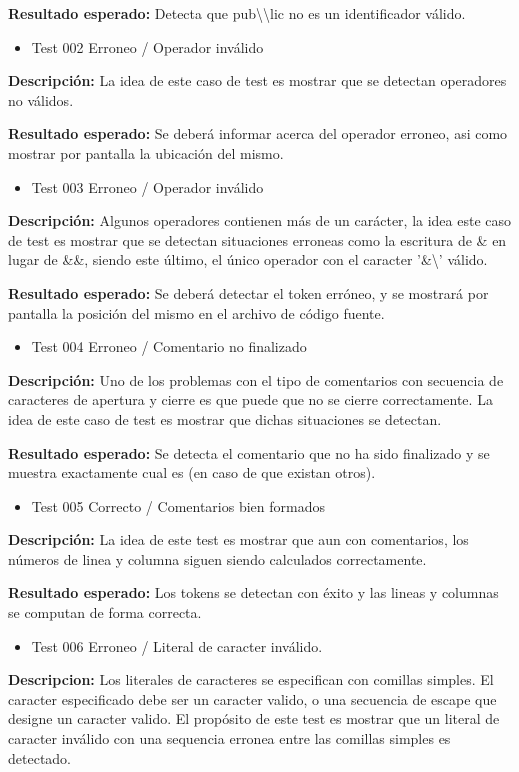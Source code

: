 \documentclass [a4paper,abstracton,titlepage]{scrartcl}
\begin{document}
\textbf{Resultado esperado:} Detecta que pub\textbackslash{}\textbackslash{}lic no es un identificador válido.
  \begin{itemize}
\item%
Test 002 Erroneo / Operador inválido

\end{itemize}
\textbf{Descripción:} La idea de este caso de test es mostrar que se detectan operadores no válidos.

\textbf{Resultado esperado:} Se deberá informar acerca del operador erroneo, asi como mostrar por pantalla la ubicación del mismo.
  \begin{itemize}
\item%
Test 003 Erroneo / Operador inválido

\end{itemize}
\textbf{Descripción:} Algunos operadores contienen más de un carácter, la idea este
caso de test es mostrar que se detectan situaciones erroneas como la escritura
de \textquotedbl{}\&{}\textquotedbl{} en lugar de \textquotedbl{}\&{}\&{}\textquotedbl{}, siendo este último, el único operador con el caracter
'\&{}\textbackslash{}' válido.

\textbf{Resultado esperado:} Se deberá detectar el token erróneo, y se mostrará por
pantalla la posición del mismo en el archivo de código fuente.
  \begin{itemize}
\item%
Test 004 Erroneo / Comentario no finalizado

\end{itemize}
\textbf{Descripción:}
Uno de los problemas con el tipo de comentarios con secuencia de
caracteres de apertura y cierre es que puede que no se cierre
correctamente. La idea de este caso de test es mostrar que dichas
situaciones se detectan.

\textbf{Resultado esperado:} Se detecta el comentario que no ha sido finalizado y se muestra exactamente cual es (en caso de que existan otros).
  \begin{itemize}
\item%
Test 005 Correcto / Comentarios bien formados

\end{itemize}
\textbf{Descripción:} La idea de este test es mostrar que aun con comentarios, los números de linea y columna siguen siendo calculados correctamente.

\textbf{Resultado esperado:} Los tokens se detectan con éxito y las lineas y columnas se computan de forma correcta.
  \begin{itemize}
\item%
Test 006 Erroneo / Literal de caracter inválido.

\end{itemize}
\textbf{Descripcion:} Los literales de caracteres se especifican con comillas simples. El caracter especificado debe ser un caracter valido, o una secuencia de escape que designe un caracter valido.  El propósito de este test es mostrar que un literal de caracter inválido con una sequencia erronea entre las comillas simples es detectado.
\end{document}
